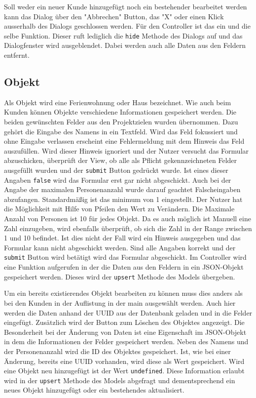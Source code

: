 Soll weder ein neuer Kunde hinzugefügt noch ein bestehender bearbeitet werden kann das Dialog über den "Abbrechen" Button, das "X" oder einen Klick ausserhalb des Dialogs geschlossen werden. Für den Controller ist das ein und die selbe Funktion. Dieser ruft lediglich die \texttt{hide} Methode des Dialogs auf und das Dialogfenster wird ausgeblendet. Dabei werden auch alle Daten aus den Feldern entfernt.

\subsection{Objekt}
Als Objekt wird eine Ferienwohnung oder Haus bezeichnet. Wie auch beim Kunden können Objekte verschiedene Informationen gespeichert werden. Die beiden gewünschten Felder aus den Projektzielen wurden übernommen. Dazu gehört die Eingabe des Namens in ein Textfeld. Wird das Feld fokussiert und ohne Eingabe verlassen erscheint eine Fehlermeldung mit dem Hinweis das Feld auszufüllen. Wird dieser Hinweis ignoriert und der Nutzer versucht das Formular abzuschicken, überprüft der View, ob alle als Pflicht gekennzeichneten Felder ausgefüllt wurden und der \texttt{submit} Button gedrückt wurde. Ist eines dieser Angaben \texttt{false} wird das Formular erst gar nicht abgeschickt. Auch bei der Angabe der maximalen Personenanzahl wurde darauf geachtet Falscheingaben abzufangen. Standardmäßig ist das minimum von 1 eingestellt. Der Nutzer hat die Möglichkeit mit Hilfe von Pfeilen den Wert zu Verändern. Die Maximale Anzahl von Personen ist 10 für jedes Objekt. Da es auch möglich ist Manuell eine Zahl einzugeben, wird ebenfalls überprüft, ob sich die Zahl in der Range zwischen 1 und 10 befindet. Ist dies nicht der Fall wird ein Hinweis ausgegeben und das Formular kann nicht abgeschickt werden. Sind alle Angaben korrekt und der \texttt{submit} Button wird betätigt wird das Formular abgeschickt. Im Controller wird eine Funktion aufgerufen in der die Daten aus den Feldern in ein JSON-Objekt gespeichert werden. Dieses wird der \texttt{upsert} Methode des Models übergeben. 

Um ein bereits existierendes Objekt bearbeiten zu können muss dies anders als bei den Kunden in der Auflistung in der main ausgewählt werden. Auch hier werden die Daten anhand der UUID aus der Datenbank geladen und in die Felder eingefügt. Zusätzlich wird der Button zum Löschen des Objektes angezeigt. Die Besonderheit bei der Änderung von Daten ist eine Eigenschaft im JSON-Objekt in dem die Informationen der Felder gespeichert werden. Neben des Namens und der Personenanzahl wird die ID des Objektes gespeichert. Ist, wie bei einer Änderung, bereits eine UUID vorhanden, wird diese als Wert gespeichert. Wird eine Objekt neu hinzugefügt ist der Wert \texttt{undefined}. Diese Information erlaubt wird in der \texttt{upsert} Methode des Models abgefragt und dementsprechend ein neues Objekt hinzugefügt oder ein bestehendes aktualisiert.


